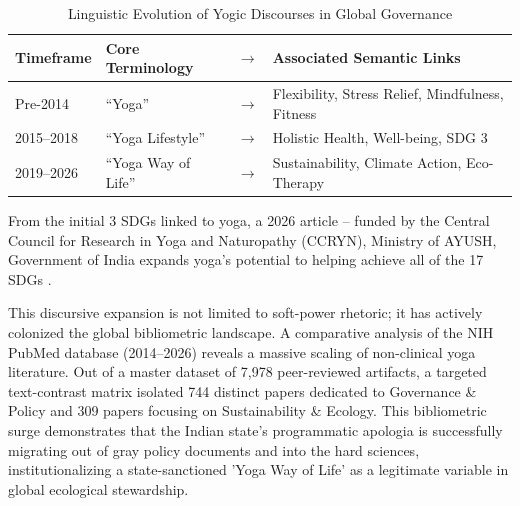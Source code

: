 \documentclass[11pt]{article}
\begin{document}
\begin{table}[htbp]
\centering
\caption{Linguistic Evolution of Yogic Discourses in Global Governance}
\label{tab:yoga_discourse_evolution}
\begin{tabular}{llcl}
\hline
\textbf{Timeframe} & \textbf{Core Terminology} & $\rightarrow$ & \textbf{Associated Semantic Links} \\ \hline
Pre-2014 & ``Yoga'' & $\rightarrow$ & Flexibility, Stress Relief, Mindfulness, Fitness \\ 
2015--2018 & ``Yoga Lifestyle'' & $\rightarrow$ & Holistic Health, Well-being, SDG 3 \\ 
2019--2026 & ``Yoga Way of Life'' & $\rightarrow$ & Sustainability, Climate Action, Eco-Therapy \\ \hline
\end{tabular}
\end{table}


From the initial 3 SDGs linked to yoga, a 2026 article – funded by the Central Council for Research in Yoga and Naturopathy (CCRYN), Ministry of AYUSH, Government of India expands yoga's potential to helping achieve all of the 17 SDGs \cite{jagannathan2026}.

This discursive expansion is not limited to soft-power rhetoric; it has actively colonized the global bibliometric landscape. A comparative analysis of the NIH PubMed database (2014–2026) reveals a massive scaling of non-clinical yoga literature. Out of a master dataset of 7,978 peer-reviewed artifacts, a targeted text-contrast matrix isolated 744 distinct papers dedicated to Governance & Policy and 309 papers focusing on Sustainability & Ecology. This bibliometric surge demonstrates that the Indian state's programmatic apologia is successfully migrating out of gray policy documents and into the hard sciences, institutionalizing a state-sanctioned 'Yoga Way of Life' as a legitimate variable in global ecological stewardship.
\end{document}
